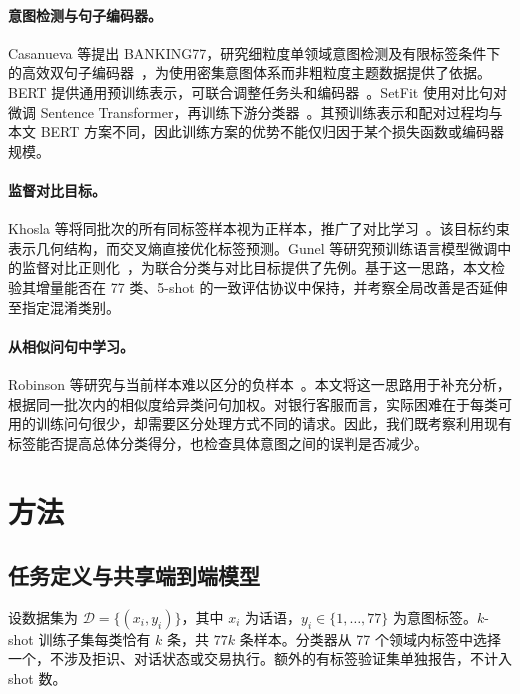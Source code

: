 \documentclass[runningheads]{llncs}
\begin{document}
\paragraph{意图检测与句子编码器。}
Casanueva 等提出 BANKING77，研究细粒度单领域意图检测及有限标签条件下的高效双句子编码器~\cite{banking}，为使用密集意图体系而非粗粒度主题数据提供了依据。BERT 提供通用预训练表示，可联合调整任务头和编码器~\cite{bert}。SetFit 使用对比句对微调 Sentence Transformer，再训练下游分类器~\cite{setfit}。其预训练表示和配对过程均与本文 BERT 方案不同，因此训练方案的优势不能仅归因于某个损失函数或编码器规模。

\paragraph{监督对比目标。}
Khosla 等将同批次的所有同标签样本视为正样本，推广了对比学习~\cite{supcon}。该目标约束表示几何结构，而交叉熵直接优化标签预测。Gunel 等研究预训练语言模型微调中的监督对比正则化~\cite{gunel}，为联合分类与对比目标提供了先例。基于这一思路，本文检验其增量能否在 77 类、5-shot 的一致评估协议中保持，并考察全局改善是否延伸至指定混淆类别。

\paragraph{从相似问句中学习。}
Robinson 等研究与当前样本难以区分的负样本~\cite{hard}。本文将这一思路用于补充分析，根据同一批次内的相似度给异类问句加权。对银行客服而言，实际困难在于每类可用的训练问句很少，却需要区分处理方式不同的请求。因此，我们既考察利用现有标签能否提高总体分类得分，也检查具体意图之间的误判是否减少。

\section{方法}
\subsection{任务定义与共享端到端模型}
设数据集为 $\mathcal D=\{(x_i,y_i)\}$，其中 $x_i$ 为话语，$y_i\in\{1,\ldots,77\}$ 为意图标签。$k$-shot 训练子集每类恰有 $k$ 条，共 $77k$ 条样本。分类器从 77 个领域内标签中选择一个，不涉及拒识、对话状态或交易执行。额外的有标签验证集单独报告，不计入 shot 数。
\end{document}
